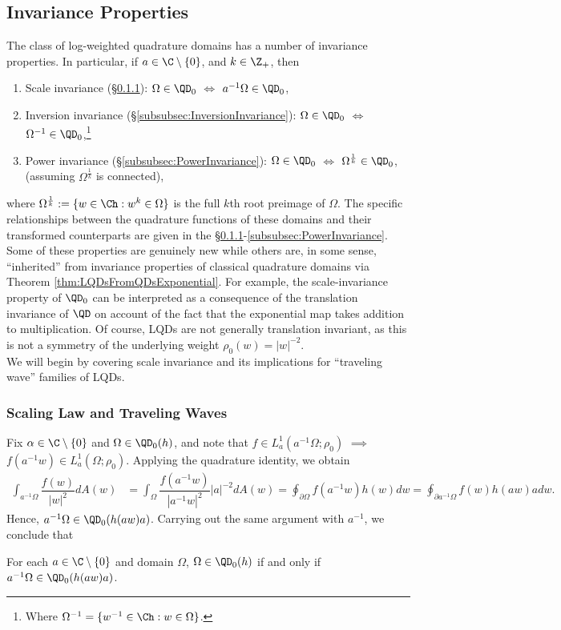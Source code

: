 \documentclass{article}
\numberwithin{equation}{section}
\begin{document}
\subsection{Invariance Properties}
The class of log-weighted quadrature domains has a number of invariance properties. In particular, if $a\in\C\setminus\{0\}$, and $k\in\Z_{+}$, then
\begin{enumerate}
    \item Scale invariance (\S\ref{subsubsec:ScalingLaw}):\;\;\;\;\;\; $\Omega\in\QD_0$ $\iff$ $a^{-1}\Omega\in\QD_0$,
    \item Inversion invariance (\S\ref{subsubsec:InversionInvariance}): $\Omega\in\QD_0$ $\iff$ $\Omega^{-1}\in\QD_0$,\footnote{Where $\Omega^{-1}=\{w^{-1}\in\Ch:w\in\Omega\}$.}
    \item Power invariance (\S\ref{subsubsec:PowerInvariance}):\;\;\;\;\; $\Omega\in\QD_0$ $\iff$ $\Omega^{\frac{1}{k}}\in\QD_0$, (assuming $\Omega^{\frac{1}{k}}$ is connected),
\end{enumerate}
where $\Omega^{\frac{1}{k}}:=\{w\in\Ch:w^k\in\Omega\}$ is the full $k$th root preimage of $\Omega$. The specific relationships between the quadrature functions of these domains and their transformed counterparts are given in the \S\ref{subsubsec:ScalingLaw}-\ref{subsubsec:PowerInvariance}. Some of these properties are genuinely new while others are, in some sense, ``inherited'' from invariance properties of classical quadrature domains via Theorem \ref{thm:LQDsFromQDsExponential}. For example, the scale-invariance property of $\QD_0$ can be interpreted as a consequence of the translation invariance of $\QD$ on account of the fact that the exponential map takes addition to multiplication. Of course, LQDs are not generally translation invariant, as this is not a symmetry of the underlying weight $\rho_0(w)=|w|^{-2}$.\\


\noindent We will begin by covering scale invariance and its implications for ``traveling wave'' families of LQDs.



\subsubsection{Scaling Law and Traveling Waves}\label{subsubsec:ScalingLaw}
Fix $\alpha\in\C\setminus\{0\}$ and $\Omega\in\QD_0(h)$, and note that $f\in L_a^1(a^{-1}\Omega;\rho_0)$ $\implies$ $f(a^{-1}w)\in L_a^1(\Omega;\rho_0)$. Applying the quadrature identity, we obtain
\begin{align*}
    \int_{a^{-1}\Omega}\dfrac{f(w)}{|w|^2}dA(w)&=\int_{\Omega}\dfrac{f(a^{-1}w)}{|a^{-1}w|^2}|a|^{-2}dA(w)=\oint_{\partial\Omega}f(a^{-1}w)h(w)dw=\oint_{\partial a^{-1}\Omega}f(w)h(aw)adw.
\end{align*}
Hence, $a^{-1}\Omega\in\QD_0(h(aw)a)$. Carrying out the same argument with $a^{-1}$, we conclude that
\begin{theorem}\label{thm:ScalingLaw}
    For each $a\in\C\setminus\{0\}$ and domain $\Omega$, $\Omega\in\QD_0(h)$ if and only if $a^{-1}\Omega\in\QD_0(h(aw)a)$.
\end{theorem}
\end{document}
